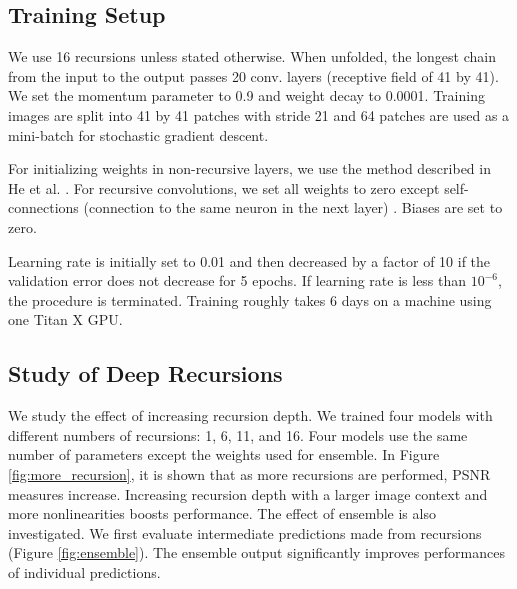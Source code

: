 \documentclass[10pt,twocolumn,letterpaper]{article}
\begin{document}
\subsection{Training Setup}
%
%
%
%
%
%

We use 16 recursions unless stated otherwise. When unfolded, the longest chain from the input to the output passes 20 conv. layers (receptive field of 41 by 41). We set the momentum parameter to 0.9 and weight decay to 0.0001. Training images are split into 41 by 41 patches with stride 21 and 64 patches are used as a mini-batch for stochastic gradient descent. 

For initializing weights in non-recursive layers, we use the method described in He et al. \cite{he2015delving}. For recursive convolutions, we set all weights to zero except self-connections (connection to the same neuron in the next layer) \cite{socher2012semantic, le2015simple}.  Biases are set to zero.

Learning rate is initially set to 0.01 and then decreased by a factor of 10 if the validation error does not decrease for 5 epochs. If learning rate is less than $10^{-6}$, the procedure is terminated. Training roughly takes 6 days on a machine using one Titan X GPU. 

\subsection{Study of Deep Recursions}
We study the effect of increasing recursion depth. We trained four models with different numbers of recursions: 1, 6, 11, and 16. Four models use the same number of parameters except the weights used for ensemble. In Figure \ref{fig:more_recursion}, it is shown that as more recursions are performed, PSNR measures increase. Increasing recursion depth with a larger image context and more nonlinearities boosts performance. The effect of ensemble is also investigated. We first evaluate intermediate predictions made from recursions (Figure \ref{fig:ensemble}). The ensemble output significantly improves performances of individual predictions. 
\end{document}
